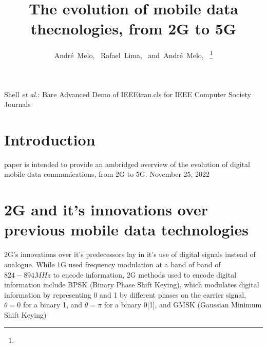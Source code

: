 \documentclass[10pt,journal,compsoc]{IEEEtran}
\begin{document}
\title{The evolution of mobile data thecnologies, from 2G to 5G}
\author{André~Melo,~
        Rafael~Lima,~
        and~André~Melo,~%
\IEEEcompsocitemizethanks{\IEEEcompsocthanksitem\protect\\
\IEEEcompsocthanksitem }%
\thanks{}}

%
{Shell \MakeLowercase{\textit{et al.}}: Bare Advanced Demo of IEEEtran.cls for IEEE Computer Society Journals}



\maketitle


\IEEEdisplaynontitleabstractindextext
\IEEEpeerreviewmaketitle


\ifCLASSOPTIONcompsoc
{}
\else
\section{Introduction}
\label{sec:introduction}
\fi
{} paper is intended to provide an ambridged overview of the evolution of digital mobile data communications, from 2G to 5G.
\hfill November 25, 2022

\section{2G and it's innovations over previous mobile data technologies}
2G's innovations over it's predecessors lay in it's use of digital signals instead of analogue. While 1G used frequency modulation at a band of band of $824-894MHz$ to encode information, 2G methods used to encode digital information include BPSK (Binary Phase Shift Keying), which modulates digital information by representing 0 and 1 by different phases on the carrier signal, $ \theta = 0 $ for a binary 1, and $ \theta=\pi $ for a binary 0[1], and GMSK (Gaussian Minimum Shift Keying)
\end{document}
